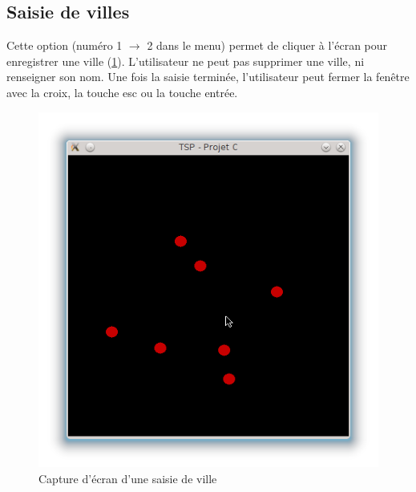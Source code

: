 \documentclass[a4paper,11pt]{article}
\begin{document}
\subsection{Saisie de villes}
Cette option (numéro 1 $\rightarrow$ 2 dans le menu) permet de cliquer à l'écran pour enregistrer une ville (\ref{fig2}). L'utilisateur ne peut pas supprimer une ville, ni renseigner son nom. Une fois la saisie terminée, l'utilisateur peut fermer la fenêtre avec la croix, la touche esc ou la touche entrée.
\begin{center}
\begin{figure}[htbp]
\begin{center}
\includegraphics[scale=0.3]{saisie.png}
\caption{Capture d'écran d'une saisie de ville}
\label{fig2}
\end{center}
\end{figure}
\end{center}
\end{document}
